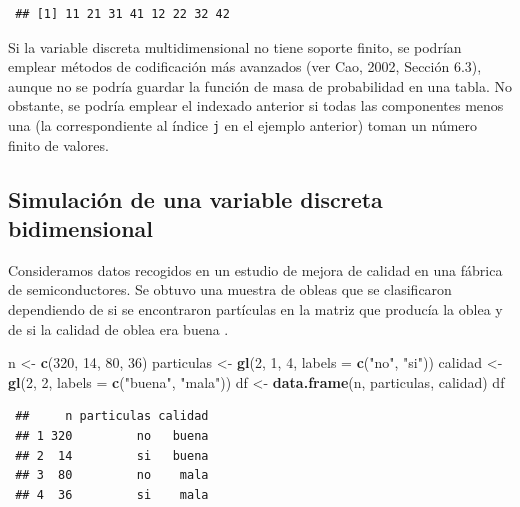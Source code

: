 \documentclass[
  spanish,
  10pt,
]{book}
\newenvironment{Shaded}{\begin{snugshade}}{\end{snugshade}}
\newcommand{\AttributeTok}[1]{\textcolor[rgb]{0.13,0.29,0.53}{#1}}
\newcommand{\DecValTok}[1]{\textcolor[rgb]{0.00,0.00,0.81}{#1}}
\newcommand{\FunctionTok}[1]{\textcolor[rgb]{0.13,0.29,0.53}{\textbf{#1}}}
\newcommand{\NormalTok}[1]{#1}
\newcommand{\OtherTok}[1]{\textcolor[rgb]{0.56,0.35,0.01}{#1}}
\newcommand{\StringTok}[1]{\textcolor[rgb]{0.31,0.60,0.02}{#1}}
\theoremstyle{break}
\theoremstyle{nonumberplain}
\begin{document}
\begin{verbatim}
 ## [1] 11 21 31 41 12 22 32 42
\end{verbatim}

Si la variable discreta multidimensional no tiene soporte finito, se podrían emplear métodos de codificación más avanzados (ver Cao, 2002, Sección 6.3), aunque no se podría guardar la función de masa de probabilidad en una tabla.
No obstante, se podría emplear el indexado anterior si todas las componentes menos una (la correspondiente al índice \texttt{j} en el ejemplo anterior) toman un número finito de valores.

\subsection{Simulación de una variable discreta bidimensional}\label{simulaciuxf3n-de-una-variable-discreta-bidimensional}

Consideramos datos recogidos en un estudio de mejora de calidad en una fábrica de semiconductores.
Se obtuvo una muestra de obleas que se clasificaron dependiendo de si se encontraron partículas en la matriz que producía la oblea y de si la calidad de oblea era buena \citep[para más detalles ver][]{hall1994}.

\begin{Shaded}
\begin{Highlighting}[]
\NormalTok{n }\OtherTok{\textless{}{-}} \FunctionTok{c}\NormalTok{(}\DecValTok{320}\NormalTok{, }\DecValTok{14}\NormalTok{, }\DecValTok{80}\NormalTok{, }\DecValTok{36}\NormalTok{)}
\NormalTok{particulas }\OtherTok{\textless{}{-}} \FunctionTok{gl}\NormalTok{(}\DecValTok{2}\NormalTok{, }\DecValTok{1}\NormalTok{, }\DecValTok{4}\NormalTok{, }\AttributeTok{labels =} \FunctionTok{c}\NormalTok{(}\StringTok{"no"}\NormalTok{, }\StringTok{"si"}\NormalTok{))}
\NormalTok{calidad }\OtherTok{\textless{}{-}} \FunctionTok{gl}\NormalTok{(}\DecValTok{2}\NormalTok{, }\DecValTok{2}\NormalTok{, }\AttributeTok{labels =} \FunctionTok{c}\NormalTok{(}\StringTok{"buena"}\NormalTok{, }\StringTok{"mala"}\NormalTok{))}
\NormalTok{df }\OtherTok{\textless{}{-}} \FunctionTok{data.frame}\NormalTok{(n, particulas, calidad)}
\NormalTok{df}
\end{Highlighting}
\end{Shaded}

\begin{verbatim}
 ##     n particulas calidad
 ## 1 320         no   buena
 ## 2  14         si   buena
 ## 3  80         no    mala
 ## 4  36         si    mala
\end{verbatim}
\end{document}
